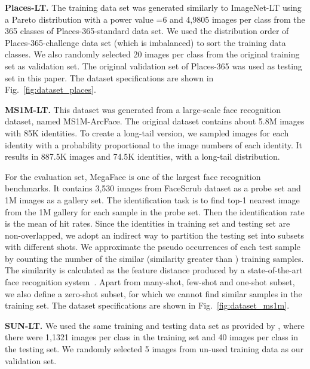 \documentclass[10pt,twocolumn,letterpaper]{article}
\begin{document}
\vspace{2pt}
\noindent
\textbf{Places-LT.} 
The training data set was generated similarly to ImageNet-LT using a Pareto distribution with a power value =6 and 4,9805 images per class from the 365 classes of Places-365-standard data set. We used the distribution order of Places-365-challenge data set (which is imbalanced) to sort the training data classes. We also randomly selected 20 images per class from the original training set as validation set. The original validation set of Places-365 was used as testing set in this paper. The dataset specifications are shown in Fig.~\ref{fig:dataset_places}. 

\vspace{2pt}
\noindent
\textbf{MS1M-LT.}
This dataset was generated from a large-scale face recognition dataset, named MS1M-ArcFace. The original dataset contains about 5.8M images with 85K identities. To create a long-tail version, we sampled images for each identity with a probability proportional to the image numbers of each identity. It results in 887.5K images and 74.5K identities, with a long-tail distribution.

For the evaluation set, MegaFace is one of the largest face recognition benchmarks. It contains 3,530 images from FaceScrub dataset as a probe set and 1M images as a gallery set. The identification task is to find top-1 nearest image from the 1M gallery for each sample in the probe set. Then the identification rate is the mean of hit rates. Since the identities in training set and testing set are non-overlapped, we adopt an indirect way to partition the testing set into subsets with different shots. We approximate the pseudo occurrences of each test sample by counting the number of the similar (similarity greater than ) training samples. 
The similarity is calculated as the feature distance produced by a state-of-the-art face recognition system~\cite{deng2018arcface}.
Apart from many-shot, few-shot and one-shot subset, we also define a zero-shot subset, for which we cannot find similar samples in the training set.
The dataset specifications are shown in Fig.~\ref{fig:dataset_ms1m}.

\vspace{2pt}
\noindent
\textbf{SUN-LT.} 
We used the same training and testing data set as provided by \cite{wang2017learning}, where there were 1,1321 images per class in the training set and 40 images per class in the testing set. We randomly selected 5 images from un-used training data as our validation set. 
\end{document}
